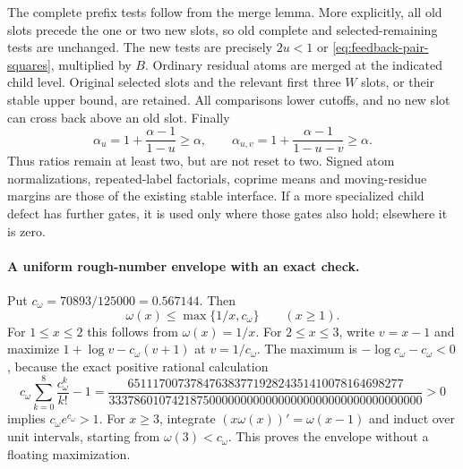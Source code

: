 The complete prefix tests follow from the merge lemma.  More
explicitly, all old slots precede the one or two new slots, so
old complete and selected-remaining tests are unchanged.  The
new tests are precisely $2u<1$ or
\eqref{eq:feedback-pair-squares}, multiplied by $B$.
Ordinary residual atoms are merged at the indicated child level.
Original selected slots and the relevant first three $W$ slots,
or their stable upper bound, are retained.  All comparisons lower
cutoffs, and no new slot can cross back above an old slot.
Finally
\[
 \alpha_u=1+\frac{\alpha-1}{1-u}\ge\alpha,\qquad
 \alpha_{u,v}=1+\frac{\alpha-1}{1-u-v}\ge\alpha.
\]
Thus ratios remain at least two, but are not reset to two.
Signed atom normalizations, repeated-label factorials, coprime
means and moving-residue margins are those of the existing stable
interface.  If a more specialized child defect has further gates,
it is used only where those gates also hold; elsewhere it is zero.

\paragraph{A uniform rough-number envelope with an exact check.}
Put $c_\omega=70893/125000=0.567144$.  Then
\begin{equation}\label{eq:feedback-omega-envelope}
 \omega(x)\le\max\{1/x,c_\omega\}\qquad(x\ge1).
\end{equation}
For $1\le x\le2$ this follows from $\omega(x)=1/x$.
For $2\le x\le3$, write $v=x-1$ and maximize
$1+\log v-c_\omega(v+1)$ at $v=1/c_\omega$.
The maximum is $-\log c_\omega-c_\omega<0$, because the exact
positive rational calculation
\[
 c_\omega\sum_{k=0}^{8}\frac{c_\omega^k}{k!}-1
 =\frac{65111700737847638377192824351410078164698277}
 {33378601074218750000000000000000000000000000000000}>0
\]
implies $c_\omega e^{c_\omega}>1$.
For $x\ge3$, integrate $(x\omega(x))'=\omega(x-1)$ and induct
over unit intervals, starting from $\omega(3)<c_\omega$.
This proves the envelope without a floating maximization.

